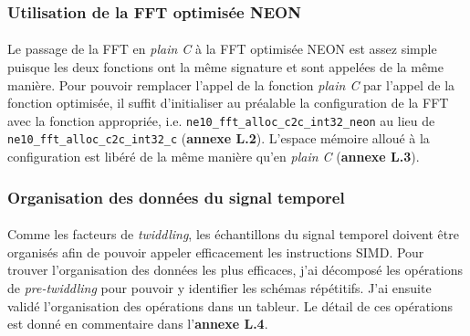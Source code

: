 \documentclass{article}
\begin{document}
    \subsubsection{Utilisation de la FFT optimisée NEON}
    \paragraph{}
    Le passage de la FFT en \emph{plain C} à la FFT optimisée NEON est assez simple puisque les deux fonctions ont la même signature et sont appelées de la même manière. Pour pouvoir remplacer l'appel de la fonction \emph{plain C} par l'appel de la fonction optimisée, il suffit d'initialiser au préalable la configuration de la FFT avec la fonction appropriée, i.e. \texttt{ne10\_fft\_alloc\_c2c\_int32\_neon} au lieu de \texttt{ne10\_fft\_alloc\_c2c\_int32\_c} (\textbf{annexe L.2}). L'espace mémoire alloué à la configuration est libéré de la même manière qu'en \emph{plain C} (\textbf{annexe L.3}).

    \subsubsection{Organisation des données du signal temporel}
    \paragraph{}
    Comme les facteurs de \emph{twiddling}, les échantillons du signal temporel doivent être organisés afin de pouvoir appeler efficacement les instructions SIMD. Pour trouver l'organisation des données les plus efficaces, j'ai décomposé les opérations de \emph{pre-twiddling} pour pouvoir y identifier les schémas répétitifs. J'ai ensuite validé l'organisation des opérations dans un tableur. Le détail de ces opérations est donné en commentaire dans l'\textbf{annexe L.4}.
\end{document}
